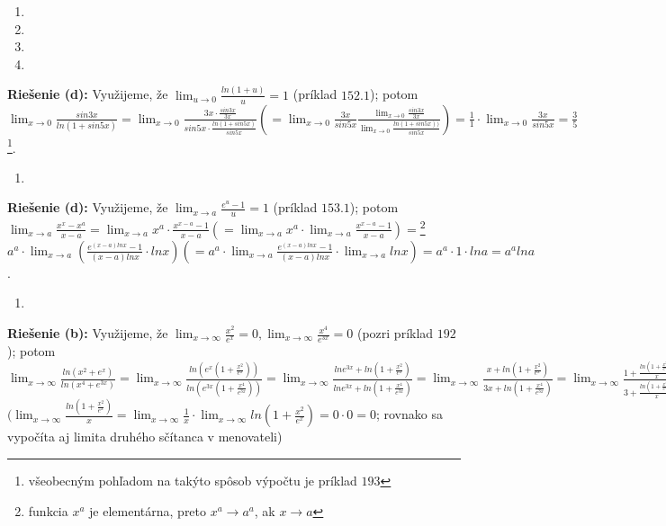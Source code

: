 \begin{enumerate}[resume]
	\item {}
	\item {}
	\item {}
	\item {}
\end{enumerate}

\textbf{Riešenie (d):}
Využijeme, že $\lim_{u \rightarrow 0}\frac{ln(1+u)}{u}=1$ (príklad $152.1$); potom $\lim_{x \rightarrow 0}\frac{sin 3x}{ln(1+sin 5x)}=\lim_{x \rightarrow 0}\frac{3x \cdot \frac{sin 3x}{3x}}{sin 5x \cdot \frac{ln (1+sin 5x)}{sin 5x}}(=\lim_{x \rightarrow 0} \frac{3x}{sin 5x} \frac{\lim_{x \rightarrow 0}\frac{sin 3x}{3x}}{\lim_{x \rightarrow 0} \frac{ln(1+sin 5x))}{sin 5x}})=\frac{1}{1}\cdot \lim_{x \rightarrow 0}\frac{3x}{sin 5x}=\frac{3}{5}$
\footnote{všeobecným pohľadom na takýto spôsob výpočtu je príklad $193$}. 
\begin{enumerate}[resume]
	\item {}
\end{enumerate}

\textbf{Riešenie (d):}
Využijeme, že $\lim_{x \rightarrow a}\frac{e^u-1}{u}=1$ (príklad $153.1$); potom $\lim_{x \rightarrow a}\frac{x^x-x^a}{x-a}=\lim_{x \rightarrow a}x^a \cdot \frac{x^{x-a}-1}{x-a}(=\lim_{x \rightarrow a}x^a \cdot \lim_{x \rightarrow a}\frac{x^{x-a}-1}{x-a})=$\footnote{funkcia $x^a$ je elementárna, preto $x^a \rightarrow a^a$, ak $x \rightarrow a$} $a^a \cdot \lim_{x \rightarrow a}(\frac{e^{(x-a)ln x}-1}{(x-a)ln x}\cdot ln x)(=a^a \cdot \lim_{x \rightarrow a}\frac{e^{(x-a)ln x}-1}{(x-a)ln x}\cdot \lim_{x \rightarrow a}ln x)=a^a \cdot 1 \cdot ln a=a^a ln a$.

\begin{enumerate}[resume]
	\item {}
\end{enumerate}

\textbf{Riešenie (b):}
Využijeme, že $\lim_{x \rightarrow \infty} \frac{x^2}{e^x}=0,\lim_{x \rightarrow \infty}\frac{x^4}{e^{3x}}=0$ (pozri príklad $192$); potom 
$\lim_{x \rightarrow \infty} \frac{ln(x^2+e^x)}{ln(x^4+e^{3x})}=\lim_{x \rightarrow \infty} \frac{ln(e^x(1+\frac{x^2}{e^x}))}{ln(e^{3x}(1+\frac{x^4}{e^{3x}}))}=\lim_{x \rightarrow \infty}\frac{ln e^{3x}+ln(1+\frac{x^2}{e^x})}{ln e^{3x}+ln(1+\frac{x^4}{e^{3x}})}=\lim_{x \rightarrow \infty}\frac{x+ln(1+\frac{x^2}{e^x})}{3x+ln(1+\frac{x^4}{e^{3x}})}=\lim_{x \rightarrow \infty}\frac{1+\frac{ln(1+\frac{x^2}{e^x})}{x}}{3+\frac{ln(1+\frac{x^4}{e^x})}{x}}=\frac{1}{3}$ 	$(\lim_{x \rightarrow \infty}\frac{ln(1+\frac{x^2}{e^x})}{x}=\lim_{x \rightarrow \infty}\frac{1}{x} \cdot \lim_{x \rightarrow \infty}ln(1+\frac{x^2}{e^x})=0 \cdot 0=0$; rovnako sa vypočíta aj limita druhého sčítanca v menovateli)

